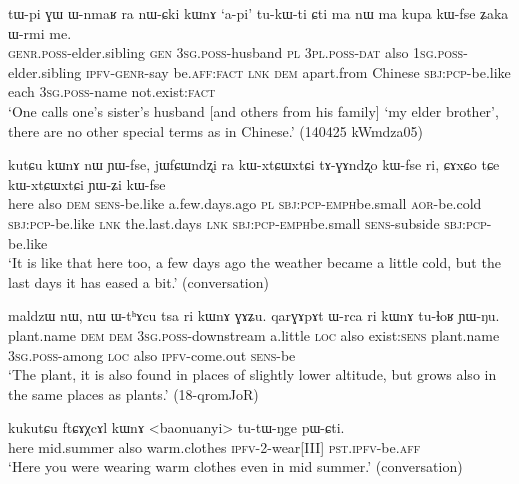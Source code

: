    \begin{exe}
\ex \label{ex:nWCki.kWnA}
\gll  tɯ-pi ɣɯ ɯ-nmaʁ ra nɯ-ɕki kɯnɤ `a-pi' tu-kɯ-ti ɕti ma nɯ ma kupa kɯ-fse ʑaka ɯ-rmi me.\\
\textsc{genr}.\textsc{poss}-elder.sibling \textsc{gen} \textsc{3sg}.\textsc{poss}-husband \textsc{pl} \textsc{3pl}.\textsc{poss}-\textsc{dat} also \textsc{1sg}.\textsc{poss}-elder.sibling \textsc{ipfv}-\textsc{genr}-say be.\textsc{aff}:\textsc{fact} \textsc{lnk} \textsc{dem} apart.from Chinese \textsc{sbj}:\textsc{pcp}-be.like each \textsc{3sg}.\textsc{poss}-name not.exist:\textsc{fact}\\
\glt  `One calls one's sister's husband [and others from his family] `my elder brother', there are no other special terms as in Chinese.' (140425 kWmdza05)
\end{exe}


  \begin{exe}
\ex \label{ex:kutCu.kWnA}
\gll  kutɕu kɯnɤ nɯ ɲɯ-fse, jɯfɕɯndʐi ra kɯ-xtɕɯ\redp{}xtɕi tɤ-ɣɤndʐo kɯ-fse ri, ɕɤxɕo tɕe kɯ-xtɕɯ\redp{}xtɕi ɲɯ-ʑi kɯ-fse \\
here also \textsc{dem} \textsc{sens}-be.like a.few.days.ago \textsc{pl} \textsc{sbj}:\textsc{pcp}-\textsc{emph}\redp{}be.small \textsc{aor}-be.cold \textsc{sbj}:\textsc{pcp}-be.like \textsc{lnk} the.last.days \textsc{lnk} \textsc{sbj}:\textsc{pcp}-\textsc{emph}\redp{}be.small \textsc{sens}-subside \textsc{sbj}:\textsc{pcp}-be.like \\
\glt `It is like that here too, a few days ago the weather became a little cold, but the last days it has eased a bit.' (conversation)
  \end{exe}
  
    \begin{exe}
\ex \label{ex:ri.kWnA}
\gll   maldzɯ nɯ, nɯ ɯ-tʰɤcu tsa ri kɯnɤ ɣɤʑu. qarɣɤpɤt ɯ-rca ri kɯnɤ tu-ɬoʁ ɲɯ-ŋu. \\
plant.name \textsc{dem} \textsc{dem} \textsc{3sg}.\textsc{poss}-downstream a.little \textsc{loc} also exist:\textsc{sens} plant.name \textsc{3sg}.\textsc{poss}-among \textsc{loc} also \textsc{ipfv}-come.out \textsc{sens}-be \\
\glt `The  plant, it is also found in places of slightly lower altitude, but grows also in the same places as   plants.' (18-qromJoR)
    \end{exe}
    
\begin{exe}
\ex \label{ex:ftCAXcAl.kWnA}
\gll   kukutɕu ftɕɤχcɤl kɯnɤ <baonuanyi> tu-tɯ-ŋge pɯ-ɕti. \\
  here mid.summer also warm.clothes \textsc{ipfv}-2-wear[III] \textsc{pst}.\textsc{ipfv}-be.\textsc{aff} \\
  \glt `Here you were wearing warm clothes even in mid summer.' (conversation)
    \end{exe}
    
